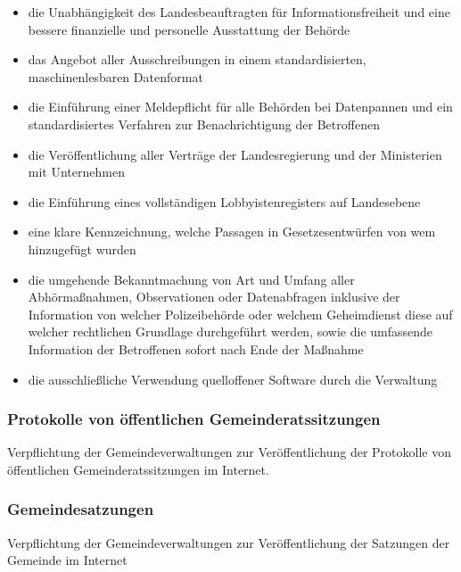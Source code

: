 \begin{itemize}
\item die Unabhängigkeit des Landesbeauftragten für Informationsfreiheit und eine bessere finanzielle und personelle Ausstattung der Behörde
\item das Angebot aller Ausschreibungen in einem standardisierten, maschinenlesbaren Datenformat
\item die Einführung einer Meldepflicht für alle Behörden bei Datenpannen und ein standardisiertes Verfahren zur Benachrichtigung der Betroffenen
\item die Veröffentlichung aller Verträge der Landesregierung und der Ministerien mit Unternehmen
\item die Einführung eines vollständigen Lobbyistenregisters auf Landesebene
\item eine klare Kennzeichnung, welche Passagen in Gesetzesentwürfen von wem hinzugefügt wurden
\item die umgehende Bekanntmachung von Art und Umfang aller Abhörmaßnahmen, Observationen oder Datenabfragen inklusive der Information von welcher Polizeibehörde oder welchem Geheimdienst diese auf welcher rechtlichen Grundlage durchgeführt werden, sowie die umfassende Information der Betroffenen sofort nach Ende der Maßnahme
\item die ausschließliche Verwendung quelloffener Software durch die Verwaltung
\end{itemize}
 
\subsubsection{Protokolle von öffentlichen Gemeinderatssitzungen}
\abstimmung
Verpflichtung der Gemeindeverwaltungen zur Veröffentlichung der Protokolle von öffentlichen Gemeinderatssitzungen im Internet.

\subsubsection {Gemeindesatzungen}
\abstimmung
Verpflichtung der Gemeindeverwaltungen zur Veröffentlichung der Satzungen der Gemeinde im Internet
